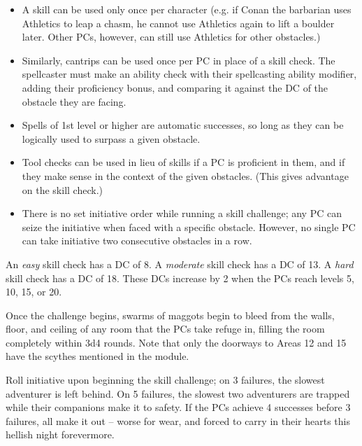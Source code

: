 \begin{itemize}
  \item A skill can be used only once per character (e.g. if Conan the barbarian uses Athletics to leap a chasm,
  he cannot use Athletics again to lift a boulder later. Other PCs, however, can still use Athletics for other
  obstacles.)
  \item Similarly, cantrips can be used once per PC in place of a skill check. The spellcaster must make an
  ability check with their spellcasting ability modifier, adding their proficiency bonus, and comparing it
  against the DC of the obstacle they are facing.
  \item Spells of 1st level or higher are automatic successes, so long as they can be logically used to surpass
  a given obstacle.
  \item Tool checks can be used in lieu of skills if a PC is proficient in them, and if they make sense in the
  context of the given obstacles. (This gives advantage on the skill check.)
  \item There is no set initiative order while running a skill challenge; any PC can seize the initiative when
  faced with a specific obstacle. However, no single PC can take initiative two consecutive obstacles in a row.
\end{itemize}
An \textit{easy} skill check has a DC of 8.
A \textit{moderate} skill check has a DC of 13.
A \textit{hard} skill check has a DC of 18.
These DCs increase by 2 when the PCs reach levels 5, 10, 15, or 20.

Once the challenge begins, swarms of maggots begin to bleed from the walls, floor, and ceiling of any room that
the PCs take refuge in, filling the room completely within 3d4 rounds. Note that only the doorways to Areas 12
and 15 have the scythes mentioned in the module.

Roll initiative upon beginning the skill challenge; on 3 failures, the slowest adventurer is left behind. On
5 failures, the slowest two adventurers are trapped while their companions make it to safety. If the PCs achieve
4 successes before 3 failures, all make it out -- worse for wear, and forced to carry in their hearts this hellish
night forevermore.

\begin{arealinks}
\end{arealinks}
